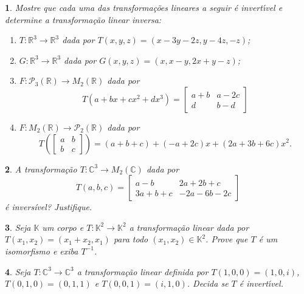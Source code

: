 \documentclass[12pt]{exam}
\newtheorem{exercicio}{}
\newcommand{\real}{\mathbb{R}}
\newcommand{\complex}{\mathbb{C}}
\newcommand{\cp}[1]{\mathbb{#1}}
\begin{document}
\begin{exercicio}
  Mostre que cada uma das transforma\c{c}\~oes lineares a seguir \'e invert{\'\i}vel e determine a transforma\c{c}\~ao linear inversa:
  \begin{enumerate}[label=({\alph*})]
    \item $T : \real^3 \to \real^3$ dada por $T(x,y,z) = (x - 3y - 2z, y - 4z, -z)$;
    
    \item $G : \real^3 \to \real^3$ dada por $G(x,y,z) = (x, x - y, 2x + y -z)$;
    
    \item $F : \mathcal{P}_3(\real) \to M_2(\real)$ dada por
    \[
      T(a + bx + cx^2 + dx^3) = \begin{bmatrix}
        a + b & a - 2c\\
        d & b - d
      \end{bmatrix}
    \]
    
    \item $F : M_2(\real) \to \mathcal{P}_2(\real)$ dada por
    \[
      T\left(\begin{bmatrix}
        a & b\\b & c
      \end{bmatrix}\right) = (a + b + c) + (-a + 2c)x + (2a + 3b + 6c)x^2.
    \]
  \end{enumerate}
\end{exercicio}

\begin{exercicio}
  A transformação $T : \complex^3 \to M_2(\complex)$ dada por
  \[
    T(a,b,c) = \begin{bmatrix}
      a - b & 2a + 2b + c\\
      3a + b + c & -2a - 6b -2c
    \end{bmatrix}
  \]
  é inversível? Justifique.
\end{exercicio}


\begin{exercicio}
  Seja $\cp{K}$ um corpo e $T : \cp{K}^2 \to \cp{K}^2$ a transforma\c{c}\~ao linear dada por $T(x_1,x_2) = (x_1 + x_2, x_1)$ para todo $(x_1,x_2) \in \cp{K}^2$. Prove que $T$ \'e um isomorfismo e exiba $T^{-1}$.
\end{exercicio}

\begin{exercicio}
  Seja $T : \complex^3 \to \complex^3$ a transforma\c{c}\~ao linear definida por $T(1,0,0) = (1,0,i)$, $T(0,1,0) = (0,1,1)$ e $T(0,0,1) = (i,1,0)$. Decida se $T$ \'e invert{\'\i}vel.
\end{exercicio}
\end{document}
